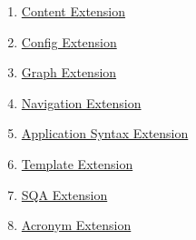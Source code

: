 \begin{enumerate}
\item 
\par \hyperref[content-extension]{Content Extension} 
\item 
\par \hyperref[config-extension]{Config Extension} 
\item 
\par \hyperref[graph-extension]{Graph Extension} 
\item 
\par \hyperref[navigation-extension]{Navigation Extension} 
\item 
\par \hyperref[application-syntax-extension]{Application Syntax Extension} 
\item 
\par \hyperref[template-extension]{Template Extension} 
\item 
\par \hyperref[sqa-extension]{SQA Extension} 
\item 
\par \hyperref[acronym-extension]{Acronym Extension}
\end{enumerate}
